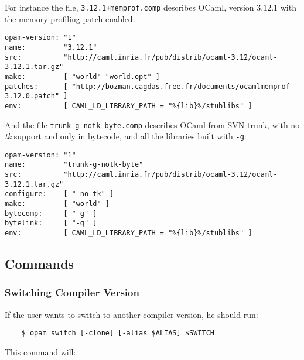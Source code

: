 \documentclass[a4paper,11pt]{article}
\begin{document}
For instance the file, {\tt 3.12.1+memprof.comp} describes OCaml,
version $3.12.1$ with the memory profiling patch enabled:

\begin{verbatim}
opam-version: "1"
name:         "3.12.1"
src:          "http://caml.inria.fr/pub/distrib/ocaml-3.12/ocaml-3.12.1.tar.gz"
make:         [ "world" "world.opt" ]
patches:      [ "http://bozman.cagdas.free.fr/documents/ocamlmemprof-3.12.0.patch" ]
env:          [ CAML_LD_LIBRARY_PATH = "%{lib}%/stublibs" ]
\end{verbatim}

And the file {\tt trunk-g-notk-byte.comp} describes OCaml from SVN
trunk, with no {\em tk} support and only in bytecode, and all the
libraries built with {\tt -g}:

\begin{verbatim}
opam-version: "1"
name:         "trunk-g-notk-byte"
src:          "http://caml.inria.fr/pub/distrib/ocaml-3.12/ocaml-3.12.1.tar.gz"
configure:    [ "-no-tk" ]
make:         [ "world" ]
bytecomp:     [ "-g" ]
bytelink:     [ "-g" ]
env:          [ CAML_LD_LIBRARY_PATH = "%{lib}%/stublibs" ]
\end{verbatim}

\subsection{Commands}

\subsubsection{Switching Compiler Version}

If the user wants to switch to another compiler version, he should run:

\begin{verbatim}
    $ opam switch [-clone] [-alias $ALIAS] $SWITCH
\end{verbatim}

This command will:
\end{document}
